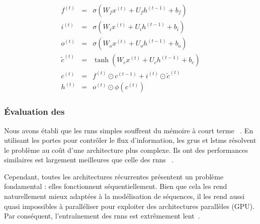 \begin{eqnarray}
    \label{eq.lstm-forget}
    f^{(t)} &=&\sigma\left(W_f x^{(t)}+U_f h^{(t-1)}+b_f\right) \\
    \label{eq.lstm-input}
    i^{(t)} &=&\sigma\left(W_i x^{(t)}+U_i h^{(t-1)}+b_i\right) \\
    \label{eq.lstm-out}
    o^{(t)} &=&\sigma\left(W_o x^{(t)}+U_o h^{(t-1)}+b_o\right) \\
    \label{eq.lstm-ctilde}
    \tilde{c}^{(t)} &=&\tanh\left(W_c x^{(t)}+U_c h^{(t-1)}+b_c\right) \\
    \label{eq.lstm-c}
    c^{(t)} &=&f^{(t)} \odot c^{(t-1)}+i^{(t)} \odot \tilde{c}^{(t)} \\
    \label{eq.lstm-h}
    h^{(t)} &=&o^{(t)} \odot \phi\left(c^{(t)}\right)
\end{eqnarray}

\subsubsection{Évaluation des }

Nous avons établi que les \glspl{rnn} simples souffrent du mémoire à court terme%
~\cite{Bengio_Simard_Frasconi_1994,Pascanu_Mikolov_Bengio}.
En utilisant les portes pour contrôler le flux d'information,
les \glspl{gru} et \glspl{lstm} résolvent le problème au coût d'une architecture plus complexe.
Ils ont des performances similaires est largement meilleures que celle des \glspl{rnn}%
~\cite{Chung_Gulcehre_Cho_Bengio_2014}.

Cependant, toutes les architectures récurrentes présentent un problème fondamental : 
elles fonctionnent séquentiellement.
Bien que cela les rend naturellement mieux adaptées à la modélisation de séquences,
il les rend aussi quasi impossibles à paralléliser pour exploiter des architectures parallèles (GPU).
Par conséquent, l'entraînement des \glspl{rnn} est extrêmement lent~\cite{Stahlberg_2020}.

